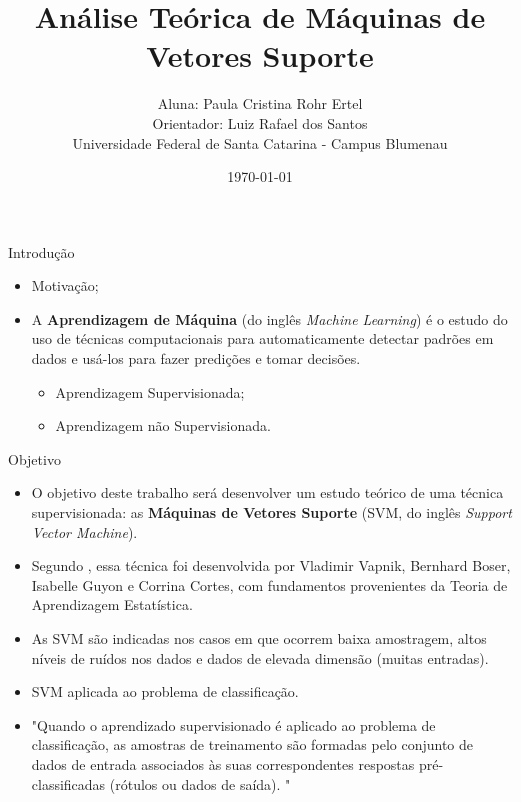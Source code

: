 \documentclass{beamer}
\title{Análise Teórica de Máquinas de Vetores Suporte}
\author{Aluna: Paula Cristina Rohr Ertel \\ Orientador: Luiz Rafael dos Santos \\ Universidade Federal de Santa Catarina - Campus Blumenau}
\date{\today}
\theoremstyle{definition}%
\begin{document}
\begin{frame}
	\maketitle
\end{frame}


\begin{frame}{Introdução}
\begin{itemize}
	\item Motivação;
	\item A \textbf{Aprendizagem de Máquina} (do inglês \textit{Machine Learning}) é o estudo do uso de técnicas computacionais para automaticamente detectar padrões em dados e usá-los para fazer predições e tomar decisões.
	\begin{itemize}
		\item Aprendizagem Supervisionada;
		\item Aprendizagem não Supervisionada.	
	\end{itemize}
\end{itemize}
\end{frame}

\begin{frame}{Objetivo}
\begin{itemize}
	\item O objetivo deste trabalho será desenvolver um estudo teórico de uma técnica supervisionada: as \textbf{Máquinas de Vetores Suporte} (SVM, do inglês \textit{Support Vector Machine}).

	\item Segundo \textcite{Evelin2017}, essa técnica foi desenvolvida por Vladimir Vapnik, Bernhard Boser, Isabelle Guyon e Corrina Cortes, com fundamentos provenientes da Teoria de Aprendizagem Estatística.
	
	\item As SVM são indicadas nos casos em que ocorrem baixa amostragem, altos níveis de ruídos nos dados e dados de elevada dimensão (muitas entradas).
	
	\item SVM aplicada ao problema de classificação.
	
	\item "Quando o aprendizado supervisionado é aplicado ao problema de classificação, as 
	amostras de treinamento são formadas pelo conjunto de dados de entrada associados 
	às suas correspondentes respostas pré-classificadas (rótulos ou dados de saída). " 
\end{itemize}
\end{frame}
\end{document}
